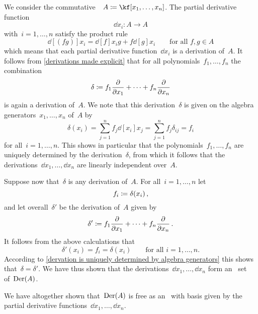 \begin{example}
  \label{derivations of commutative polynomial algebra}
  We consider the commutative~\algebra{$\kf$}~$A \defined \kf[x_1, \dotsc, x_n]$.
  The partial derivative function
  \[
    \dd{x_i}
    \colon
    A
    \to
    A
  \]
  with~$i = 1, \dotsc, n$ satisfy the product rule
  \[
    \dd[(fg)]{x_i}
    =
    \dd[f]{x_i} g + f \dd[g]{x_i}
    \qquad
    \text{for all~$f, g \in A$}
  \]
  which means that each partial derivative function~$\dd{x_i}$ is a derivation of~$A$.
  It follows from \cref{derivations made explicit} that for all polynomials~$f_1, \dotsc, f_n$ the~ combination
  \[
    \delta
    \defined
    f_1 \dd{x_1} + \dotsb + f_n \dd{x_n}
  \]
  is again a derivation of~$A$.
  We note that this derivation~$\delta$ is given on the algebra generators~$x_1, \dotsc, x_n$ of~$A$ by
  \[
    \delta(x_i)
    =
    \sum_{j=1}^n f_j \dd[x_i]{x_j}
    =
    \sum_{j=1}^n f_j \delta_{ij}
    =
    f_i
  \]
  for all~$i = 1, \dotsc, n$.
  This shows in particular that the polynomials~$f_1, \dotsc, f_n$ are uniquely determined by the derivation~$\delta$, from which it follows that the derivations~$\dd{x_1}, \dotsc, \dd{x_n}$ are linearly independent over~$A$.

  Suppose now that~$\delta$ is any derivation of~$A$.
  For all~$i = 1, \dotsc, n$ let
  \[
    f_i \coloneqq \delta(x_i) \,,
  \]
  and let overall~$\delta'$ be the derivation of~$A$ given by
  \[
    \delta'
    \defined
    f_1 \dd{x_1} + \dotsb + f_n \dd{x_n} \,.
  \]
  It follows from the above calculations that
  \[
    \delta'(x_i) = f_i = \delta(x_i)
    \qquad
    \text{for all~$i = 1, \dotsc, n$.}
  \]
  According to \cref{dervation is uniquely determined by algebra generators} this shows that~$\delta = \delta'$.
  We have thus shown that the derivations~$\dd{x_1}, \dotsc, \dd{x_n}$ form an~ set of~$\operatorname{Der}(A)$.

  We have altogether shown that~$\operatorname{Der}(A)$ is free as an~ with basis given by the partial derivative functions~$\dd{x_1}, \dotsc, \dd{x_n}$.
\end{example}


